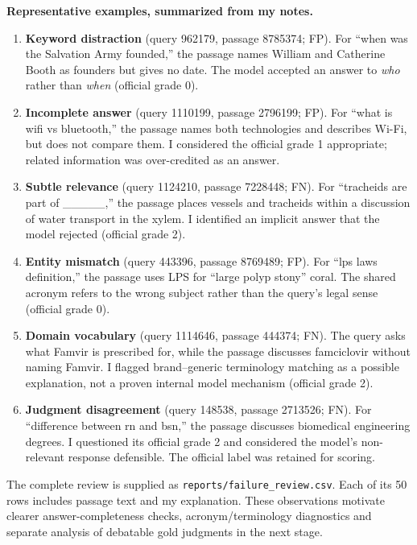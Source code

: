 \documentclass[11pt,a4paper]{article}
\begin{document}
\textbf{Representative examples, summarized from my notes.}
\begin{enumerate}[leftmargin=*,itemsep=4pt]
\item \textbf{Keyword distraction} (query 962179, passage 8785374; FP).
For ``when was the Salvation Army founded,'' the passage names William and Catherine
Booth as founders but gives no date. The model accepted an answer to \emph{who}
rather than \emph{when} (official grade 0).
\item \textbf{Incomplete answer} (query 1110199, passage 2796199; FP).
For ``what is wifi vs bluetooth,'' the passage names both technologies and describes
Wi-Fi, but does not compare them. I considered the official grade 1
appropriate; related information was over-credited as an answer.
\item \textbf{Subtle relevance} (query 1124210, passage 7228448; FN).
For ``tracheids are part of \_\_\_\_\_,'' the passage places vessels and tracheids
within a discussion of water transport in the xylem. I identified an
implicit answer that the model rejected (official grade 2).
\item \textbf{Entity mismatch} (query 443396, passage 8769489; FP).
For ``lps laws definition,'' the passage uses LPS for ``large polyp stony'' coral.
The shared acronym refers to the wrong subject rather than the query's legal
sense (official grade 0).
\item \textbf{Domain vocabulary} (query 1114646, passage 444374; FN).
The query asks what Famvir is prescribed for, while the passage discusses
famciclovir without naming Famvir. I flagged brand--generic terminology
matching as a possible explanation, not a proven internal model mechanism
(official grade 2).
\item \textbf{Judgment disagreement} (query 148538, passage 2713526; FN).
For ``difference between rn and bsn,'' the passage discusses biomedical engineering
degrees. I questioned its official grade 2 and considered the model's
non-relevant response defensible. The official label was retained for scoring.
\end{enumerate}
The complete review is supplied as \nolinkurl{reports/failure_review.csv}.
Each of its 50 rows includes passage text and my explanation. These observations motivate
clearer answer-completeness checks, acronym/terminology diagnostics and separate
analysis of debatable gold judgments in the next stage.
\end{document}
